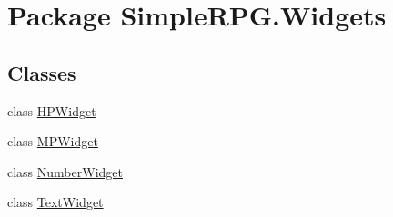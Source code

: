 \hypertarget{namespace_simple_r_p_g_1_1_widgets}{\section{Package Simple\-R\-P\-G.\-Widgets}
\label{namespace_simple_r_p_g_1_1_widgets}
}
\subsection*{Classes}
\begin{DoxyCompactItemize}
\item 
class \hyperlink{class_simple_r_p_g_1_1_widgets_1_1_h_p_widget}{H\-P\-Widget}
\item 
class \hyperlink{class_simple_r_p_g_1_1_widgets_1_1_m_p_widget}{M\-P\-Widget}
\item 
class \hyperlink{class_simple_r_p_g_1_1_widgets_1_1_number_widget}{Number\-Widget}
\item 
class \hyperlink{class_simple_r_p_g_1_1_widgets_1_1_text_widget}{Text\-Widget}
\end{DoxyCompactItemize}
